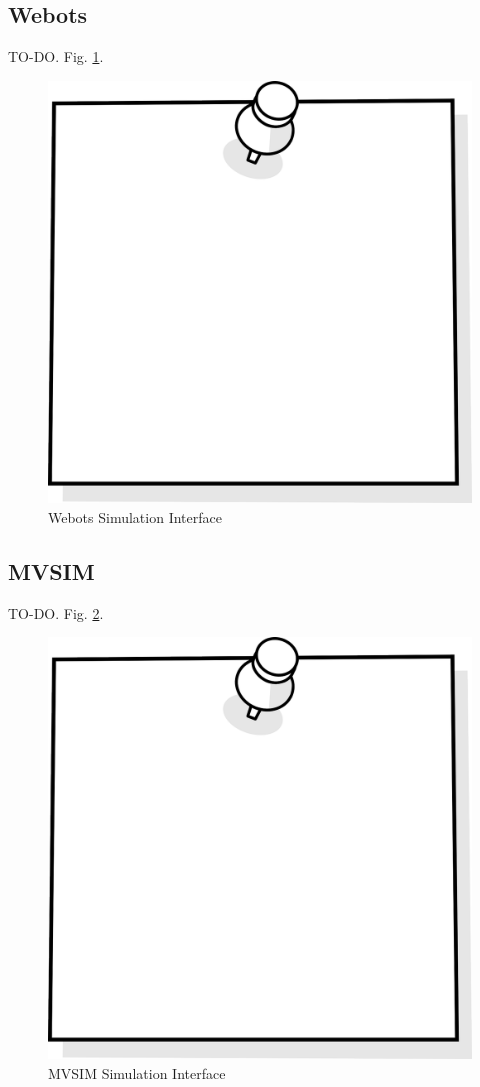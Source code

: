 \documentclass[a4paper, 10pt, conference]{ieeeconf}      %
\begin{document}
\subsection{Webots}
TO-DO. Fig. \ref{fig:Webots}.
\begin{figure}[thpb]
	\centering
    \includegraphics[width=0.7\columnwidth]{figs/example.png}
    \caption{Webots Simulation Interface}
    \label{fig:Webots}
\end{figure}
\subsection{MVSIM}
TO-DO. Fig. \ref{fig:MVSIM}.
\begin{figure}[thpb]
	\centering
    \includegraphics[width=0.7\columnwidth]{figs/example.png}
    \caption{MVSIM Simulation Interface}
    \label{fig:MVSIM}
\end{figure}
\end{document}
